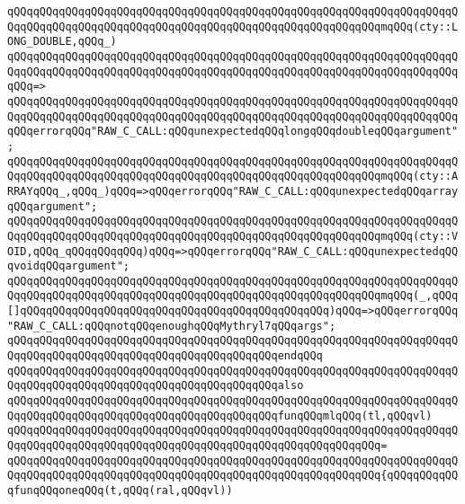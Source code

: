 \newline
\verb|qQQqqQQqqQQqqQQqqQQqqQQqqQQqqQQqqQQqqQQqqQQqqQQqqQQqqQQqqQQqqQQqqQQqqQQqqQQqqQQqqQQqqQQqqQQqqQQqqQQqqQQqqQQqqQQqqQQqqQQqqQQqqQQqmqQQq(cty::LONG_DOUBLE,qQQq_)|\newline
\verb|qQQqqQQqqQQqqQQqqQQqqQQqqQQqqQQqqQQqqQQqqQQqqQQqqQQqqQQqqQQqqQQqqQQqqQQqqQQqqQQqqQQqqQQqqQQqqQQqqQQqqQQqqQQqqQQqqQQqqQQqqQQqqQQqqQQqqQQqqQQqqQQq=>|\newline
\verb|qQQqqQQqqQQqqQQqqQQqqQQqqQQqqQQqqQQqqQQqqQQqqQQqqQQqqQQqqQQqqQQqqQQqqQQqqQQqqQQqqQQqqQQqqQQqqQQqqQQqqQQqqQQqqQQqqQQqqQQqqQQqqQQqqQQqqQQqqQQqqQQqerrorqQQq"RAW_C_CALL:qQQqunexpectedqQQqlongqQQqdoubleqQQqargument";|\newline
\newline
\verb|qQQqqQQqqQQqqQQqqQQqqQQqqQQqqQQqqQQqqQQqqQQqqQQqqQQqqQQqqQQqqQQqqQQqqQQqqQQqqQQqqQQqqQQqqQQqqQQqqQQqqQQqqQQqqQQqqQQqqQQqqQQqqQQqmqQQq(cty::ARRAYqQQq_,qQQq_)qQQq=>qQQqerrorqQQq"RAW_C_CALL:qQQqunexpectedqQQqarrayqQQqargument";|\newline
\verb|qQQqqQQqqQQqqQQqqQQqqQQqqQQqqQQqqQQqqQQqqQQqqQQqqQQqqQQqqQQqqQQqqQQqqQQqqQQqqQQqqQQqqQQqqQQqqQQqqQQqqQQqqQQqqQQqqQQqqQQqqQQqqQQqmqQQq(cty::VOID,qQQq_qQQqqQQqqQQq)qQQq=>qQQqerrorqQQq"RAW_C_CALL:qQQqunexpectedqQQqvoidqQQqargument";|\newline
\verb|qQQqqQQqqQQqqQQqqQQqqQQqqQQqqQQqqQQqqQQqqQQqqQQqqQQqqQQqqQQqqQQqqQQqqQQqqQQqqQQqqQQqqQQqqQQqqQQqqQQqqQQqqQQqqQQqqQQqqQQqqQQqqQQqmqQQq(_,qQQq[]qQQqqQQqqQQqqQQqqQQqqQQqqQQqqQQqqQQqqQQqqQQqqQQq)qQQq=>qQQqerrorqQQq"RAW_C_CALL:qQQqnotqQQqenoughqQQqMythryl7qQQqargs";|\newline
\verb|qQQqqQQqqQQqqQQqqQQqqQQqqQQqqQQqqQQqqQQqqQQqqQQqqQQqqQQqqQQqqQQqqQQqqQQqqQQqqQQqqQQqqQQqqQQqqQQqqQQqqQQqqQQqqQQqendqQQq|\newline
\newline
\verb|qQQqqQQqqQQqqQQqqQQqqQQqqQQqqQQqqQQqqQQqqQQqqQQqqQQqqQQqqQQqqQQqqQQqqQQqqQQqqQQqqQQqqQQqqQQqqQQqqQQqqQQqqQQqqQQqalso|\newline
\verb|qQQqqQQqqQQqqQQqqQQqqQQqqQQqqQQqqQQqqQQqqQQqqQQqqQQqqQQqqQQqqQQqqQQqqQQqqQQqqQQqqQQqqQQqqQQqqQQqqQQqqQQqqQQqqQQqfunqQQqmlqQQq(tl,qQQqvl)|\newline
\verb|qQQqqQQqqQQqqQQqqQQqqQQqqQQqqQQqqQQqqQQqqQQqqQQqqQQqqQQqqQQqqQQqqQQqqQQqqQQqqQQqqQQqqQQqqQQqqQQqqQQqqQQqqQQqqQQqqQQqqQQqqQQqqQQq=|\newline
\verb|qQQqqQQqqQQqqQQqqQQqqQQqqQQqqQQqqQQqqQQqqQQqqQQqqQQqqQQqqQQqqQQqqQQqqQQqqQQqqQQqqQQqqQQqqQQqqQQqqQQqqQQqqQQqqQQqqQQqqQQqqQQqqQQq{qQQqqQQqqQQqfunqQQqoneqQQq(t,qQQq(ral,qQQqvl))|\newline
